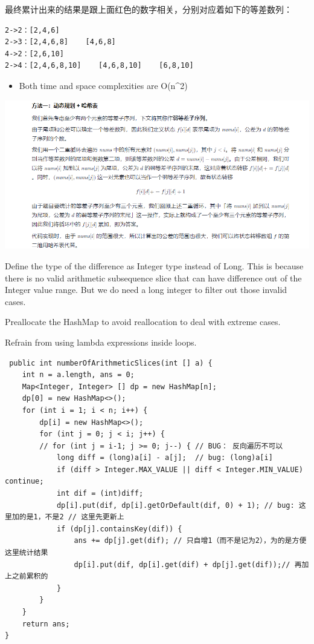 \documentclass[9pt, b5paaper]{book}
\begin{document}
\begin{enumerate}
最终累计出来的结果是跟上面红色的数字相关，分别对应着如下的等差数列：

\begin{verbatim}
2->2：[2,4,6]
2->3：[2,4,6,8]    [4,6,8]
4->2：[2,6,10]
2->4：[2,4,6,8,10]    [4,6,8,10]    [6,8,10]
\end{verbatim}
\begin{itemize}
\item Both time and space complexities are O(n\^{}2)
\end{itemize}

\includegraphics[width=.9\linewidth]{./pic/arithslice.png}

Define the type of the difference as Integer type instead of Long. This is because there is no valid arithmetic subsequence slice that can have difference out of the Integer value range. But we do need a long integer to filter out those invalid cases.

Preallocate the HashMap to avoid reallocation to deal with extreme cases.

Refrain from using lambda expressions inside loops.

\begin{verbatim}
 public int numberOfArithmeticSlices(int [] a) {
    int n = a.length, ans = 0;
    Map<Integer, Integer> [] dp = new HashMap[n];
    dp[0] = new HashMap<>();
    for (int i = 1; i < n; i++) {
        dp[i] = new HashMap<>();
        for (int j = 0; j < i; j++) {
        // for (int j = i-1; j >= 0; j--) { // BUG： 反向遍历不可以
            long diff = (long)a[i] - a[j];  // bug: (long)a[i]
            if (diff > Integer.MAX_VALUE || diff < Integer.MIN_VALUE) continue;
            int dif = (int)diff;
            dp[i].put(dif, dp[i].getOrDefault(dif, 0) + 1); // bug: 这里加的是1，不是2 // 这里先更新上
            if (dp[j].containsKey(dif)) {
                ans += dp[j].get(dif); // 只自增1（而不是记为2），为的是方便这里统计结果
                dp[i].put(dif, dp[i].get(dif) + dp[j].get(dif));// 再加上之前累积的
            }
        }
    }
    return ans;
}
\end{verbatim}
\end{enumerate}
\end{document}
